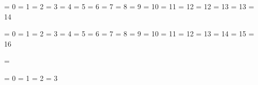 
\newif\ifdone



\chardef\@@escape      =  0
\chardef\@@begingroup  =  1
\chardef\@@endgroup    =  2
\chardef\@@mathshift   =  3
\chardef\@@alignment   =  4
\chardef\@@endofline   =  5
\chardef\@@parameter   =  6
\chardef\@@superscript =  7
\chardef\@@subscript   =  8
\chardef\@@ignore      =  9
\chardef\@@space       = 10
\chardef\@@letter      = 11
\chardef\@@other       = 12   \chardef\other  = 12
\chardef\@@active      = 13   \chardef\active = 13
\chardef\@@comment     = 14


\chardef\@@bottomlevelgroup   =  0
\chardef\@@simplegroup        =  1
\chardef\@@hboxgroup          =  2
\chardef\@@adjustedhboxgroup  =  3
\chardef\@@vboxgroup          =  4
\chardef\@@vtopgroup          =  5
\chardef\@@aligngroup         =  6
\chardef\@@noaligngroup       =  7
\chardef\@@outputgroup        =  8
\chardef\@@mathgroup          =  9
\chardef\@@discretionarygroup = 10
\chardef\@@insertgroup        = 11
\chardef\@@vcentergroup       = 12
\chardef\@@mathchoicegroup    = 13
\chardef\@@semisimplegroup    = 14
\chardef\@@mathshiftgroup     = 15
\chardef\@@mathleftgroup      = 16

\chardef\@@vadjustgroup       = \@@insertgroup


\chardef\@@batchmode     = 0
\chardef\@@nonstopmode   = 1
\chardef\@@scrollmode    = 2
\chardef\@@errorstopmode = 3



